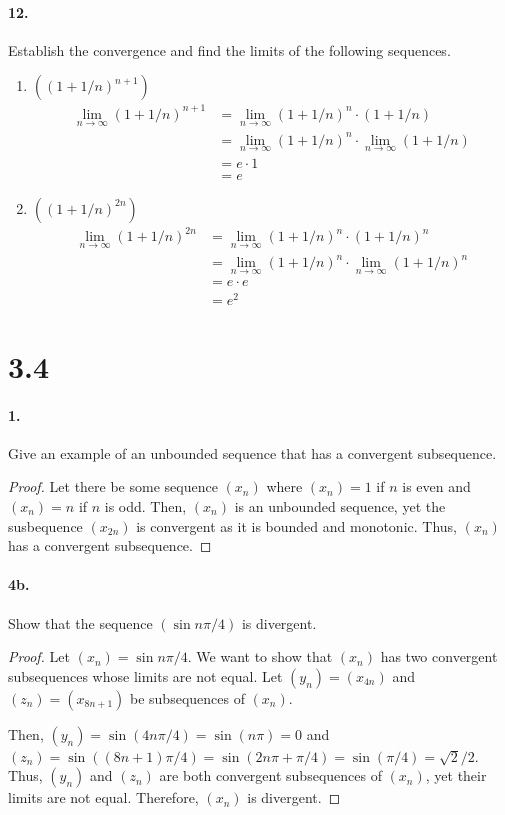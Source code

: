 \documentclass[12pt]{article}
\theoremstyle{remark}
\begin{document}
\paragraph{12.} Establish the convergence and find the limits of the following sequences.
\begin{enumerate}[label=(\alph*)]
    \item $((1 + 1/n)^{n + 1})$
    \begin{align*}
        \lim_{n \to \infty} (1 + 1/n)^{n + 1} &= \lim_{n \to \infty} (1 + 1/n)^n \cdot (1 + 1/n) \\
        &= \lim_{n \to \infty} (1 + 1/n)^n \cdot \lim_{n \to \infty} (1 + 1/n) \\
        &= e \cdot 1 \\
        &= e
    \end{align*}

    \item $((1 + 1/n)^{2n})$
    \begin{align*}
        \lim_{n \to \infty} (1 + 1/n)^{2n} &= \lim_{n \to \infty} (1 + 1/n)^n \cdot (1 + 1/n)^n \\
        &= \lim_{n \to \infty} (1 + 1/n)^n \cdot \lim_{n \to \infty} (1 + 1/n)^n \\
        &= e \cdot e \\
        &= e^2
    \end{align*}
\end{enumerate}

\section*{3.4}
\paragraph{1.} Give an example of an unbounded sequence that has a convergent subsequence.
\begin{proof}
    Let there be some sequence $(x_n)$ where $(x_n) = 1$ if $n$ is even and $(x_n) = n$ if $n$ is odd. Then, $(x_n)$ is an unbounded sequence, yet the susbequence $(x_{2n})$ is convergent as it is bounded and monotonic. Thus, $(x_n)$ has a convergent subsequence.
\end{proof}

\paragraph{4b.} Show that the sequence $(\sin n\pi/4)$ is divergent.
\begin{proof}
    Let $(x_n) = \sin n\pi/4$. We want to show that $(x_n)$ has two convergent subsequences whose limits are not equal. Let $(y_n) = (x_{4n})$ and $(z_n) = (x_{8n + 1})$ be subsequences of $(x_n)$.

    Then, $(y_n) = \sin (4n\pi/4) = \sin (n\pi) = 0$ and $(z_n) = \sin((8n + 1)\pi/4) = \sin(2n\pi + \pi/4) = \sin(\pi/4) = \sqrt{2}/2$. Thus, $(y_n)$ and $(z_n)$ are both convergent subsequences of $(x_n)$, yet their limits are not equal. Therefore, $(x_n)$ is divergent.
\end{proof}
\end{document}
